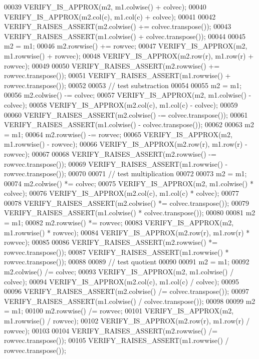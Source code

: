 \begin{DoxyCode}
00039   VERIFY\_IS\_APPROX(m2, m1.colwise() + colvec);
00040   VERIFY\_IS\_APPROX(m2.col(c), m1.col(c) + colvec);
00041 
00042   VERIFY\_RAISES\_ASSERT(m2.colwise() += colvec.transpose());
00043   VERIFY\_RAISES\_ASSERT(m1.colwise() + colvec.transpose());
00044 
00045   m2 = m1;
00046   m2.rowwise() += rowvec;
00047   VERIFY\_IS\_APPROX(m2, m1.rowwise() + rowvec);
00048   VERIFY\_IS\_APPROX(m2.row(r), m1.row(r) + rowvec);
00049 
00050   VERIFY\_RAISES\_ASSERT(m2.rowwise() += rowvec.transpose());
00051   VERIFY\_RAISES\_ASSERT(m1.rowwise() + rowvec.transpose());
00052 
00053   \textcolor{comment}{// test substraction}
00054 
00055   m2 = m1;
00056   m2.colwise() -= colvec;
00057   VERIFY\_IS\_APPROX(m2, m1.colwise() - colvec);
00058   VERIFY\_IS\_APPROX(m2.col(c), m1.col(c) - colvec);
00059 
00060   VERIFY\_RAISES\_ASSERT(m2.colwise() -= colvec.transpose());
00061   VERIFY\_RAISES\_ASSERT(m1.colwise() - colvec.transpose());
00062 
00063   m2 = m1;
00064   m2.rowwise() -= rowvec;
00065   VERIFY\_IS\_APPROX(m2, m1.rowwise() - rowvec);
00066   VERIFY\_IS\_APPROX(m2.row(r), m1.row(r) - rowvec);
00067 
00068   VERIFY\_RAISES\_ASSERT(m2.rowwise() -= rowvec.transpose());
00069   VERIFY\_RAISES\_ASSERT(m1.rowwise() - rowvec.transpose());
00070 
00071   \textcolor{comment}{// test multiplication}
00072 
00073   m2 = m1;
00074   m2.colwise() *= colvec;
00075   VERIFY\_IS\_APPROX(m2, m1.colwise() * colvec);
00076   VERIFY\_IS\_APPROX(m2.col(c), m1.col(c) * colvec);
00077 
00078   VERIFY\_RAISES\_ASSERT(m2.colwise() *= colvec.transpose());
00079   VERIFY\_RAISES\_ASSERT(m1.colwise() * colvec.transpose());
00080 
00081   m2 = m1;
00082   m2.rowwise() *= rowvec;
00083   VERIFY\_IS\_APPROX(m2, m1.rowwise() * rowvec);
00084   VERIFY\_IS\_APPROX(m2.row(r), m1.row(r) * rowvec);
00085 
00086   VERIFY\_RAISES\_ASSERT(m2.rowwise() *= rowvec.transpose());
00087   VERIFY\_RAISES\_ASSERT(m1.rowwise() * rowvec.transpose());
00088 
00089   \textcolor{comment}{// test quotient}
00090 
00091   m2 = m1;
00092   m2.colwise() /= colvec;
00093   VERIFY\_IS\_APPROX(m2, m1.colwise() / colvec);
00094   VERIFY\_IS\_APPROX(m2.col(c), m1.col(c) / colvec);
00095 
00096   VERIFY\_RAISES\_ASSERT(m2.colwise() /= colvec.transpose());
00097   VERIFY\_RAISES\_ASSERT(m1.colwise() / colvec.transpose());
00098 
00099   m2 = m1;
00100   m2.rowwise() /= rowvec;
00101   VERIFY\_IS\_APPROX(m2, m1.rowwise() / rowvec);
00102   VERIFY\_IS\_APPROX(m2.row(r), m1.row(r) / rowvec);
00103 
00104   VERIFY\_RAISES\_ASSERT(m2.rowwise() /= rowvec.transpose());
00105   VERIFY\_RAISES\_ASSERT(m1.rowwise() / rowvec.transpose());

\end{DoxyCode}
